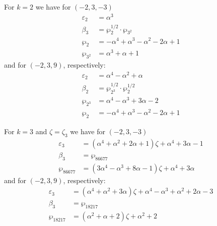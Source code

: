 \documentclass[12pt]{amsart}
\theoremstyle{definition}
\def\a{\alpha}
\def\z{\zeta}
\def\z{\zeta}
\begin{document}
\noindent 
For $k=2$ %
we have for $(-2,3,-3)$
{\small
\begin{align*}
\varepsilon_{2} &= \a^3
\\
\beta_{3} &= \wp_{2}^{1/2} \cdot \wp_{3^2}  \\
\wp_{2} &= -\a^4 + \a^3 - \a^2 - 2 \a + 1
\\
\wp_{3^2} &= \a^3 + \a + 1
\end{align*}
}
and for $(-2,3,9)$, respectively:
{\small
\begin{align*}
\varepsilon_{2} &= \a^4 - \a^2 + \a
\\
\beta_{2} &= \wp_{2^3}^{1/2} \cdot \wp_{2}^{1/2}  \\
\wp_{2^3} &= \a^4 - \a^3 + 3 \a - 2
\\
\wp_{2} &= -\a^4 + \a^3 - \a^2 - 2 \a + 1
\end{align*}
}

\noindent 
For $k=3$ and $\zeta=\zeta_3$
we have for $(-2,3,-3)$
{\small
\begin{align*}
\varepsilon_3 &= (\a^4 + \a^2 + 2 \a + 1) \z + \a^4 + 3 \a - 1
\\
\beta_3 &= \wp_{86677}  \\
\wp_{86677} &= (3 \a^4 - \a^3 + 8 \a - 1) \z + \a^4 + 3 \a
\end{align*}
}
and for $(-2,3,9)$, respectively:
{\small
\begin{align*}
\varepsilon_3 &= 
(\a^4 + \a^2 + 3 \a) \z + \a^4 - \a^3 + \a^2 + 2 \a - 3
\\
\beta_3 &= \wp_{18217}  \\
\wp_{18217} &= (\a^2 + \a + 2) \z + \a^2 + 2
\end{align*}
}
\end{document}
